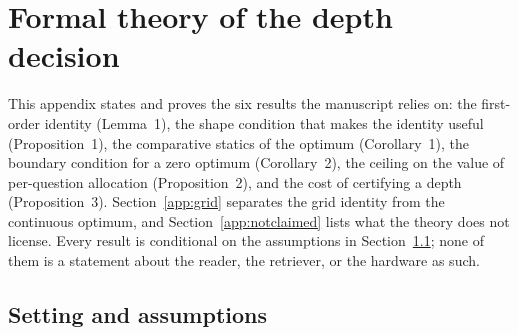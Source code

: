 %
%      
%
%
\section{Formal theory of the depth decision}\label{app:theory}

This appendix states and proves the six results the manuscript relies on: the
first-order identity (Lemma~1), the shape condition that makes the identity
useful (Proposition~1), the comparative statics of the optimum (Corollary~1),
the boundary condition for a zero optimum (Corollary~2), the ceiling on the value
of per-question allocation (Proposition~2), and the cost of certifying a depth
(Proposition~3). Section~\ref{app:grid} separates the grid identity from the
continuous optimum, and Section~\ref{app:notclaimed} lists what the theory does
not license. Every result is conditional on the assumptions in
Section~\ref{app:assumptions}; none of them is a statement about the reader, the
retriever, or the hardware as such.

\subsection{Setting and assumptions}\label{app:assumptions}

